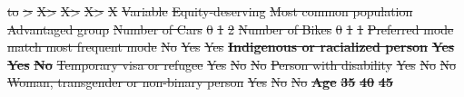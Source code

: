 \documentclass[preprint, 3p,
authoryear]{elsarticle} %
\providecommand{\DIFdeltex}[1]{{\protect\color{red}\sout{#1}}}                      %
\providecommand{\DIFdelFL}[1]{\DIFdel{#1}} %
\providecommand{\DIFdelbeginFL}{} %
\providecommand{\DIFdel}[1]{\texorpdfstring{\DIFdeltex{#1}}{}} %
\newcommand{\DIFscaledelfig}{0.5}
\newlength{\DIFdelgraphicswidth} %
\newlength{\DIFdelgraphicsheight} %
\newcommand{\DIFdelincludegraphics}[2][]{%
\sbox{\DIFdelgraphicsbox}{\DIFOincludegraphics[#1]{#2}}%
\settoboxwidth{\DIFdelgraphicswidth}{\DIFdelgraphicsbox} %
\settoboxtotalheight{\DIFdelgraphicsheight}{\DIFdelgraphicsbox} %
\scalebox{\DIFscaledelfig}{%
\parbox[b]{\DIFdelgraphicswidth}{\usebox{\DIFdelgraphicsbox}\\[-\baselineskip] \rule{\DIFdelgraphicswidth}{0em}}\llap{\resizebox{\DIFdelgraphicswidth}{\DIFdelgraphicsheight}{%
\setlength{\unitlength}{\DIFdelgraphicswidth}%
\begin{picture}(1,1)%
\thicklines\linethickness{2pt} %
{\color[rgb]{1,0,0}\put(0,0){\framebox(1,1){}}}%
{\color[rgb]{1,0,0}\put(0,0){\line( 1,1){1}}}%
{\color[rgb]{1,0,0}\put(0,1){\line(1,-1){1}}}%
\end{picture}%
}\hspace*{3pt}}} %
} %
\DeclareRobustCommand{\DIFdelbeginFL}{\DIFOdelbeginFL \let\includegraphics\DIFdelincludegraphics} %
\begin{document}
\begin{table}
\centering
\caption{\label{tab:controls}\label{tab:controls_pop}Individual profiles to estimate probabilities.}
\centering
\DIFdelbeginFL %
\DIFdelFL{to }%
\DIFdelFL{>}%
\DIFdelFL{X>}%
\DIFdelFL{X>}%
\DIFdelFL{X>}%
\DIFdelFL{X}%
\DIFdelFL{Variable }%
\DIFdelFL{Equity-deserving }%
\DIFdelFL{Most common population }%
\DIFdelFL{Advantaged group}%
\DIFdelFL{Number of Cars }%
\DIFdelFL{0 }%
\DIFdelFL{1 }%
\DIFdelFL{2}%
\DIFdelFL{Number of Bikes }%
\DIFdelFL{0 }%
\DIFdelFL{1 }%
\DIFdelFL{1}%
\DIFdelFL{Preferred mode match most frequent mode }%
\DIFdelFL{No }%
\DIFdelFL{Yes }%
\DIFdelFL{Yes}%
\textbf{\DIFdelFL{Indigenous or racialized person}} %
\textbf{\DIFdelFL{Yes}} %
\textbf{\DIFdelFL{Yes}} %
\textbf{\DIFdelFL{No}}%
\DIFdelFL{Temporary visa or refugee }%
\DIFdelFL{Yes }%
\DIFdelFL{No }%
\DIFdelFL{No}%
\DIFdelFL{Person with disability }%
\DIFdelFL{Yes }%
\DIFdelFL{No }%
\DIFdelFL{No}%
\DIFdelFL{Woman, transgender or non-binary person }%
\DIFdelFL{Yes }%
\DIFdelFL{No }%
\DIFdelFL{No}%
\textbf{\DIFdelFL{Age}} %
\textbf{\DIFdelFL{35}} %
\textbf{\DIFdelFL{40}} %
\textbf{\DIFdelFL{45}}%

\end{table}
\end{document}

